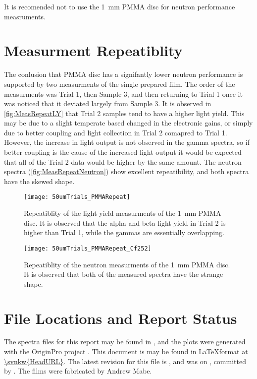 \documentclass[draftcls,onecolumn]{IEEEtran}
\begin{document}
It is recomended not to use the \SI{1}{\mm} PMMA disc for neutron performance measruments.
\pagebreak
\appendices
\section{Measurment Repeatiblity}
\label{sec:MeasRepeat}
The conlusion that PMMA disc has a signifantly lower neutron performance is supported by two measurments of the single prepared film.
The order of the measurments was Trial 1, then Sample 3, and then returning to Trial 1 once it was noticed that it deviated largely from Sample 3.
It is observed in \autoref{fig:MeasRepeatLY} that Trial 2 samples tend to have a higher light yield. 
This may be due to a slight temperate based changed in the electronic gains, or simply due to better coupling and light collection in Trial 2 comapred to Trial 1.
However, the increase in light output is not observed in the gamma spectra, so if better coupling is the cause of the increased light output it would be expected that all of the Trial 2 data would be higher by the same amount.
The neutron spectra (\autoref{fig:MeasRepeatNeutron}) show excellent repeatibility, and both spectra have the skewed shape.
\begin{figure}
  \centering
  \texttt{[image: 50umTrials\_PMMARepeat]}
  \caption[PMMA Light Yield Repeatiblity]{Repeatiblity of the light yield measurments of the \SI{1}{\mm} PMMA disc. It is observed that the alpha and beta light yield in Trial 2 is higher than Trial 1, while the gammas are essentially overlapping.}
  \label{fig:MeasRepeatLY}
\end{figure}
\begin{figure}
  \centering
  \texttt{[image: 50umTrials\_PMMARepeat\_Cf252]}
  \caption[PMMA Neutron Repeatiblity]{Repeatiblity of the neutron measurments of the \SI{1}{\mm} PMMA disc. It is observed that both of the measured spectra have the strange shape.}
  \label{fig:MeasRepeatNeutron}
\end{figure}

\section{File Locations and Report Status}
The spectra files for this report may be found in , and the plots were generated with the OriginPro project .
This document is may be found in \LaTeX format at \url{\svnkw{HeadURL}}.  
The latest revision for this file is \svnrev, and was on \svndate, committed by \svnauthor.
The films were fabricated by Andrew Mabe.
\end{document}

